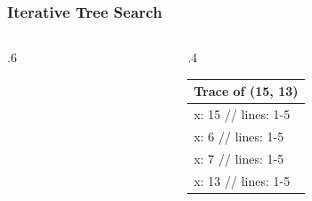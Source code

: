 \documentclass[10pt]{beamer}
\begin{document}
\begin{frame}[t]\frametitle{Iterative Tree Search}
	\begin{columns}[T] %
	\begin{column}{.6\linewidth} %
{\footnotesize
		
} %

	\end{column} %
	\begin{column}{.4\linewidth} %

		{\small 
		
		} %

		{\footnotesize 
			\begin{tabular}{| l |}
			\hline
			Trace of {\scriptsize \IterativeTreeSearch(15, 13)}\\
			\hline
			x: 15  // lines: 1-5\\
			x: 6  // lines: 1-5\\
			x: 7  // lines: 1-5\\
			x: 13  // lines: 1-5\\
			\hline
			\end{tabular}
		} %

	\end{column} %
	\end{columns} %
	
\end{frame}




\end{document}
